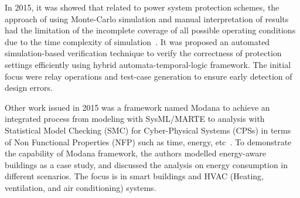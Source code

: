 \documentclass[runningheads]{llncs}
\begin{document}
%
In 2015, it was showed that related to power system protection schemes, the approach of using Monte-Carlo simulation and manual interpretation of results had the limitation of the incomplete coverage of all possible operating conditions due to the time complexity of simulation~\cite{Sengupta2015}. It was proposed an automated simulation-based verification technique to verify the correctness of protection settings efficiently using hybrid automata-temporal-logic framework. The initial focus were relay operations and test-case generation to ensure early detection of design errors. %

Other work issued in 2015 was a framework named Modana to achieve an integrated process from modeling with SysML/MARTE to analysis with Statistical Model Checking (SMC) for Cyber-Physical Systems (CPSs) in terms of Non Functional Properties (NFP) such as time, energy, etc~\cite{Cheng2015}. To demonstrate the capability of Modana framework, the authors modelled energy-aware buildings as a case study, and discussed the analysis on energy consumption in different scenarios. The focus is in smart buildings and HVAC (Heating, ventilation, and air conditioning) systems. %
 
\end{document}
